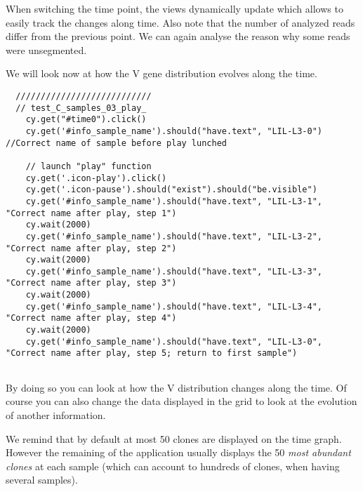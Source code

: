 When switching the time point, the views dynamically update which allows to
easily track the changes along time. Also note that the number of analyzed
reads differ from the previous point. We can again analyse the reason why some
reads were unsegmented.

\bigskip

We will look now at how the V gene distribution evolves along the time.
\begin{verbatim}
  ///////////////////////////
  // test_C_samples_03_play_
    cy.get("#time0").click()
    cy.get('#info_sample_name').should("have.text", "LIL-L3-0") //Correct name of sample before play lunched

    // launch "play" function
    cy.get('.icon-play').click()
    cy.get('.icon-pause').should("exist").should("be.visible")
    cy.get('#info_sample_name').should("have.text", "LIL-L3-1", "Correct name after play, step 1")
    cy.wait(2000)
    cy.get('#info_sample_name').should("have.text", "LIL-L3-2", "Correct name after play, step 2")
    cy.wait(2000)
    cy.get('#info_sample_name').should("have.text", "LIL-L3-3", "Correct name after play, step 3")
    cy.wait(2000)
    cy.get('#info_sample_name').should("have.text", "LIL-L3-4", "Correct name after play, step 4")
    cy.wait(2000)
    cy.get('#info_sample_name').should("have.text", "LIL-L3-0", "Correct name after play, step 5; return to first sample")


\end{verbatim}

By doing so you can look at how the V distribution changes along the time.
Of course you can also change the data displayed in the grid to look at
the evolution of another information.

\bigskip

We remind that by default at most 50 clones are displayed
on the time graph. However the remaining of the application usually displays
the 50 \textit{most abundant clones} at each sample (which can account to hundreds of
clones, when having several samples).

